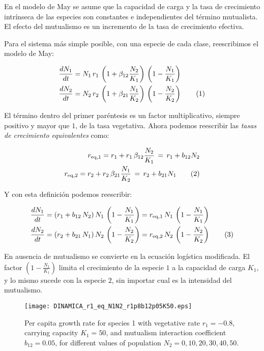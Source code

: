 En el modelo de May se asume que la capacidad de carga y la tasa de crecimiento intrínseca de las especies son constantes e independientes del término mutualista. El efecto del mutualismo es un incremento de la tasa de crecimiento efectiva.

Para el sistema más simple posible, con una especie de cada clase, reescribimos el modelo de May:

\begin{align*}
\displaystyle & \frac{dN_1}{dt}= N_1 \, r_1\, \left(1 + \beta_{12}\frac{N_2}{K_1} \right) \, \left(1-\frac{N_1}{K_1}\right) \\
\displaystyle & \frac{dN_2}{dt}=N_2 \, r_2\, \left(1 + \beta_{21}\frac{N_1}{K_2} \right) \, \left(1-\frac{N_2}{K_2}\right)
\stepcounter{equation}\tag{\theequation}
\label{myeq3}
\end{align*}

El término dentro del primer paréntesis es un factor multiplicativo, siempre positivo y mayor que $1$, de la tasa vegetativa.
Ahora podemos reescribir las \textit{tasas de crecimiento equivalentes} como:

\begin{align*}
\displaystyle r_{\rm{eq},1}=r_1 + r_1\, \beta_{12} \frac{N_2}{K_1}\, =\, r_1 + b_{12}N_2  \\
\displaystyle r_{\rm{eq},2}=r_2 + r_2\, \beta_{21} \frac{N_1}{K_2}\, =\, r_2 + b_{21}N_1 \stepcounter{equation}
\tag{\theequation}
\end{align*}

Y con esta definición podemos reescribir:

\begin{align*}
\displaystyle & \frac{dN_1}{dt}= (r_1 + b_{12}\, N_2) \, N_1\,\left(1-\frac{N_1}{K_1}\right)=r_{\rm{eq},1}\,N_1\,\left(1-\frac{N_1}{K_1}\right) \\
\displaystyle & \frac{dN_2}{dt}= (r_2 + b_{21}\, N_1) \, N_2\,\left(1-\frac{N_2}{K_2}\right)=r_{\rm{eq},2}\,N_2\,\left(1-\frac{N_2}{K_2}\right)
\stepcounter{equation}\tag{\theequation}
\label{eq:May_reff}
\end{align*}

En ausencia de mutualismo se convierte en la ecuación logística modificada. El factor $\left(1-\frac{N_{1}}{K_{1}}\right)$ limita el crecimiento de la especie $1$ a la capacidad de carga $K_{1}$, y lo mismo sucede con la especie $2$, sin importar cual es la intensidad del mutualismo.

\begin{figure}[t]
\centering
\texttt{[image: DINAMICA\_r1\_eq\_N1N2\_r1p8b12p05K50.eps]}
\caption{Per capita growth rate for species 1 with vegetative rate $r_1=-0.8$, carrying capacity $K_1=50$, and mutualism interaction coefficient $b_{12}=0.05$, for different values of population $N_2=0,10,20,30,40,50$.}
\label{fig:per capita_growth_rate_mutualism}
\end{figure}

